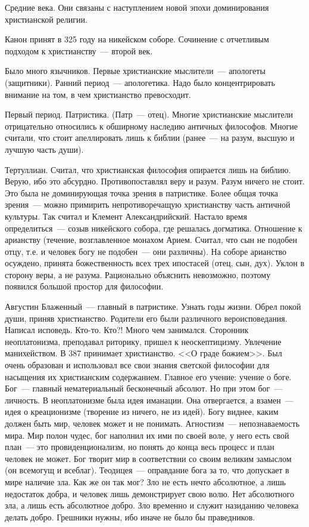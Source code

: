 Средние века.
Они связаны с наступлением новой эпохи доминирования христианской религии.

Канон принят в 325 году на никейском соборе. Сочинение с отчетливым подходом к христианству~--- второй век.

Было много язычников. Первые христианские мыслители~--- апологеты (защитники). Ранний период~--- апологетика. Надо было концентрировать внимание на том, в чем христианство превосходит.

Первый период. Патристика. (Патр~--- отец). Многие христианские мыслители отрицательно относились к обширному наследию античных философов. Многие считали, что стоит апеллировать лишь к библии (ранее~--- на разум, высшую и лучшую часть души).

Тертуллиан. Считал, что христианская философия опирается лишь на библию. Верую, ибо это абсурдно. Противопоставлял веру и разум. Разум ничего не стоит.
Это была не доминирующая точка зрения в патристике. Более общая точка зрения~--- можно примирить непротиворечащую христианству часть античной культуры. Так считал и Клемент Александрийский.
Настало время определиться~--- созыв никейского собора, где решалась догматика. Отношение к арианству (течение, возглавленное монахом Арием. Считал, что сын не подобен отцу, т.е. и человек богу не подобен~--- они различны). На соборе арианство осуждено, принята божественность всех трех ипостасей (отец, сын, дух). Уклон в сторону веры, а не разума. Рационально объяснить невозможно, поэтому появился большой простор для философии.

Августин Блаженный~--- главный в патристике. Узнать годы жизни.
Обрел покой души, приняв христианство. Родители его были различного вероисповедания. Написал исповедь.
Кто-то. Кто?!
Много чем занимался. Сторонник неоплатонизма, преподавал риторику, пришел к неоскептицизму. Увлечение манихейством. В 387 принимает христианство. <<О граде божием>>. Был очень образован и использовал все свои знания светской философии для насыщения их христианским содержанием. Главное его учение: учение о боге. Бог~--- главный нематериальный бесконечный абсолют. Но при этом бог~--- личность. В неоплатонизме была идея иманации. Она отвергается, а взамен~--- идея о креационизме (творение из ничего, не из идей). Богу виднее, каким должен быть мир, человек может и не понимать. Агностизм~--- непознаваемость мира. Мир полон чудес, бог наполнил их ими по своей воле, у него есть свой план~--- это провиденционализм, но понять до конца весь процесс и план человек не может. Бог творит мир в соответствии со своим великим замыслом (он всемогущ и всеблаг). Теодицея~--- оправдание бога за то, что допускает в мире наличие зла. Как же он так мог? Зло не есть нечто абсолютное, а лишь недостаток добра, и человек лишь демонстрирует свою волю. Нет абсолютного зла, а лишь есть абсолютное добро. Зло временно и служит назиданию человека делать добро. Грешники нужны, ибо иначе не было бы праведников.

